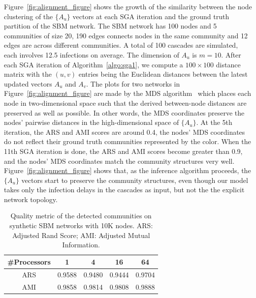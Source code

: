 Figure~\ref{fig:alignment_figure} shows the growth of the similarity between the node clustering of the $\{A_u\}$ vectors at each SGA iteration and the ground truth partition of the SBM network. The SBM network has 100 nodes and 5 communities of size 20, 190 edges connects nodes in the same community and 12 edges are across different communities. A total of 100 cascades are simulated, each involves 12.5 infections on average. The dimension of $A_u$ is $m=10$. After each SGA iteration of Algorithm~\ref{algo:sga1}, we compute a $100\times 100$ distance matrix with the $(u,v)$ entries being the Euclidean distances between the latest updated vectors $A_u$ and $A_v$. The plots for two networks in Figure~\ref{fig:alignment_figure} are made by the MDS algorithm~\cite{cox2000multidimensional} which places each node in two-dimensional space such that the derived between-node distances are preserved as well as possible. In other words, the MDS coordinates preserve the nodes' pairwise distances in the high-dimensional space of $\{A_u\}$. At the 5th iteration, the ARS and AMI scores are around 0.4, the nodes' MDS coordinates do not reflect their ground truth communities represented by the color. When the 11th SGA iteration is done, the ARS and AMI scores become greater than 0.9, and the nodes' MDS coordinates match the community structures very well. Figure~\ref{fig:alignment_figure} shows that, as the inference algorithm proceeds, the $\{A_u\}$ vectors start to preserve the community structures, even though our model takes only the infection delays in the cascades as input, but not the the explicit network topology.


\begin{table}[ht]
  \centering
  \caption{Quality metric of the detected communities on synthetic SBM networks with 10K nodes. ARS: Adjusted Rand Score; AMI: Adjusted Mutual Information.}
  \begin{tabular}{ccccc}
    \hline
    \#Processors & {\bf 1} & {\bf 4} & {\bf 16} & {\bf 64}\\
    \hline
    ARS & 0.9588 & 0.9480 &	0.9444 & 0.9704\\
    AMI & 0.9858 & 0.9814 & 0.9808 & 0.9888\\
    \hline
  \end{tabular}
  \label{tab:chap3_1}
\end{table}

